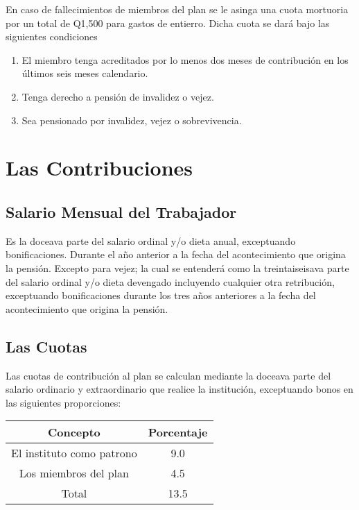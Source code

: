 \documentclass[12pt,letterpaper,titlepage]{article}
\begin{document}
{En caso de fallecimientos de miembros del plan se le asinga una cuota mortuoria por un total de Q1,500 para gastos de entierro. Dicha cuota se dará bajo las siguientes condiciones 

\begin{enumerate}
	\item El miembro tenga acreditados por lo menos dos meses de contribución en los últimos seis meses calendario.
	\item Tenga derecho a pensión de invalidez o vejez.
	\item Sea pensionado por invalidez, vejez o sobrevivencia.
\end{enumerate}


\newpage
\section{Las Contribuciones}

\subsection{Salario Mensual del Trabajador}

Es la doceava parte del salario ordinal y/o dieta anual, exceptuando bonificaciones. Durante el año anterior a la fecha del acontecimiento que origina la pensión. Excepto para vejez; la cual se entenderá como la treintaiseisava parte del salario ordinal y/o dieta devengado incluyendo cualquier otra retribución, exceptuando bonificaciones durante los tres años anteriores a la fecha del acontecimiento que origina la pensión.

\subsection{Las Cuotas}

Las cuotas de contribución al plan se calculan mediante la doceava parte del salario ordinario y extraordinario que realice la institución, exceptuando bonos en las siguientes proporciones:

\begin{center}
	\begin{tabular}{|c||c|}
		\hline 
		\rule[-1ex]{0pt}{2.5ex} Concepto & Porcentaje \\ 
		\hline 
		\hline 
		\rule[-1ex]{0pt}{2.5ex}
		\rule[-1ex]{0pt}{2.5ex} El instituto como patrono & 9.0 \\ 
		\hline 
		\rule[-1ex]{0pt}{2.5ex} Los miembros del plan & 4.5 \\ 
		\hline 
		\rule[-1ex]{0pt}{2.5ex} Total & 13.5 \\ 
		\hline 
	\end{tabular} 
\end{center}

}
\end{document}
